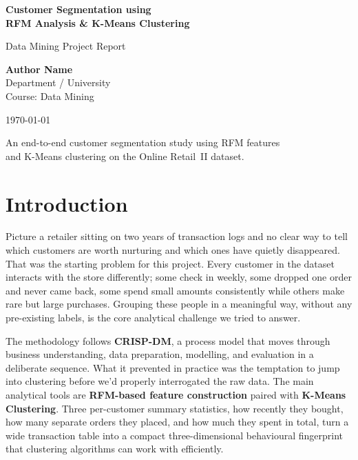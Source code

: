 \documentclass[12pt, a4paper]{article}
\begin{document}
\begin{titlepage}
    \centering
    \vspace*{2cm}
    
    {\Huge\bfseries Customer Segmentation using\\[0.4em]
     RFM Analysis \& K-Means Clustering\par}
    
    \vspace{1.5cm}
    {\Large Data Mining Project Report\par}
    
    \vspace{2cm}
    {\large
    \textbf{Author Name}\\[0.3em]
    Department / University\\[0.3em]
    Course: Data Mining\\[0.3em]
    }
    
    \vspace{2cm}
    {\large \today\par}
    
    \vfill
    {\small An end-to-end customer segmentation study using RFM features\\
    and K-Means clustering on the Online Retail~II dataset.}
\end{titlepage}

\newpage
\tableofcontents
\newpage

\section{Introduction}\label{sec:intro}

Picture a retailer sitting on two years of transaction logs and no clear way to tell which customers are worth nurturing and which ones have quietly disappeared. That was the starting problem for this project. Every customer in the dataset interacts with the store differently; some check in weekly, some dropped one order and never came back, some spend small amounts consistently while others make rare but large purchases. Grouping these people in a meaningful way, without any pre-existing labels, is the core analytical challenge we tried to answer.

The methodology follows \textbf{CRISP-DM}, a process model that moves through business understanding, data preparation, modelling, and evaluation in a deliberate sequence. What it prevented in practice was the temptation to jump into clustering before we'd properly interrogated the raw data. The main analytical tools are \textbf{RFM-based feature construction} paired with \textbf{K-Means Clustering}. Three per-customer summary statistics, how recently they bought, how many separate orders they placed, and how much they spent in total, turn a wide transaction table into a compact three-dimensional behavioural fingerprint that clustering algorithms can work with efficiently.
\end{document}

